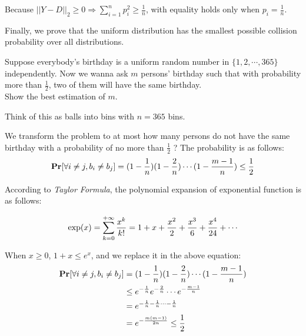 \begin{problem}[20 points.]
Because $||Y - D||_2 \ge 0 \Rightarrow \sum_{i=1}^{n}p_i^2 \ge \frac{1}{n}$, with equality holds only when $p_i = \frac{1}{n}$. 

Finally, we prove that the uniform distribution has the smallest possible collision probability over all distributions.
\end{problem}


\begin{problem}
Suppose everybody's birthday is a uniform random number in $\{1, 2, \cdots, 365\}$ independently.
Now we wanna ask $m$ persons' birthday such that with probability more than $\frac{1}{2}$, two of them will have the same birthday. \\
\hspace*{.2in} Show the best estimation of $m$.

\begin{hint}
Think of this as balls into bins with $n = 365$ bins.
\end{hint}

\Answer

We transform the problem to at most how many persons do not have the same birthday with a probability of no more than $\frac{1}{2}$ ?
The probability is as follows:
\begin{equation}
\begin{aligned}
\mathbf{Pr}[\forall i \neq j, b_i \neq b_j] = (1 - \frac{1}{n})(1 - \frac{2}{n}) \cdots (1 - \frac{m - 1}{n}) \le \frac{1}{2} \notag
\end{aligned}
\end{equation}

According to \textit{Taylor Formula}, the polynomial expansion of exponential function is as follows:

\begin{equation}
\begin{aligned}
\exp(x) = \sum_{k=0}^{+\infty} \frac{x^k}{k!} = 1 + x + \frac{x^2}{2} + \frac{x^3}{6} + \frac{x^4}{24} + \cdots \notag
\end{aligned}
\end{equation}

When $x \ge 0$, $1 + x \le e^x$, and we replace it in the above equation:
\begin{equation}
\begin{aligned}
\mathbf{Pr}[\forall i \neq j, b_i \neq b_j] &= (1 - \frac{1}{n})(1 - \frac{2}{n}) \cdots (1 - \frac{m - 1}{n}) \\ \notag
& \le e^{-\frac{1}{n}}e^{-\frac{2}{n}} \cdots e^{-\frac{m-1}{n}} \\
& = e^{-\frac{1}{n}-\frac{1}{n} \cdots -\frac{1}{n}} \\
& = e^{-\frac{m(m-1)}{2n}} \le \frac{1}{2}
\end{aligned}
\end{equation}


\end{problem}
